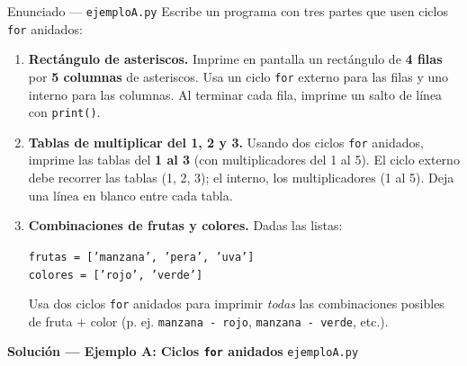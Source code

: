 \documentclass[12pt,a4paper]{article}
\begin{document}
\vspace{0.8em}
\begin{enunciadobox}{Enunciado — \texttt{ejemploA.py}}
Escribe un programa con tres partes que usen ciclos \texttt{for} anidados:

\begin{enumerate}
  \item \textbf{Rectángulo de asteriscos.}
        Imprime en pantalla un rectángulo de \textbf{4 filas} por \textbf{5 columnas}
        de asteriscos.  Usa un ciclo \texttt{for} externo para las filas y
        uno interno para las columnas.  Al terminar cada fila, imprime
        un salto de línea con \texttt{print()}.

  \item \textbf{Tablas de multiplicar del 1, 2 y 3.}
        Usando dos ciclos \texttt{for} anidados, imprime las tablas del
        \textbf{1 al 3} (con multiplicadores del 1 al 5).
        El ciclo externo debe recorrer las tablas (1, 2, 3);
        el interno, los multiplicadores (1 al 5).
        Deja una línea en blanco entre cada tabla.

  \item \textbf{Combinaciones de frutas y colores.}
        Dadas las listas:
        \begin{center}
          \texttt{frutas = ['manzana', 'pera', 'uva']}\\
          \texttt{colores = ['rojo', 'verde']}
        \end{center}
        Usa dos ciclos \texttt{for} anidados para imprimir \emph{todas}
        las combinaciones posibles de fruta + color
        (p. ej. \texttt{manzana - rojo}, \texttt{manzana - verde}, etc.).
\end{enumerate}
\end{enunciadobox}

\newpage
\begin{solucionbanner}
  {\large\bfseries\color{solColor} Solución — Ejemplo A: Ciclos \texttt{for} anidados}
  \hfill \texttt{ejemploA.py}
\end{solucionbanner}

\vspace{0.8em}


\vspace{0.8em}
\end{document}
